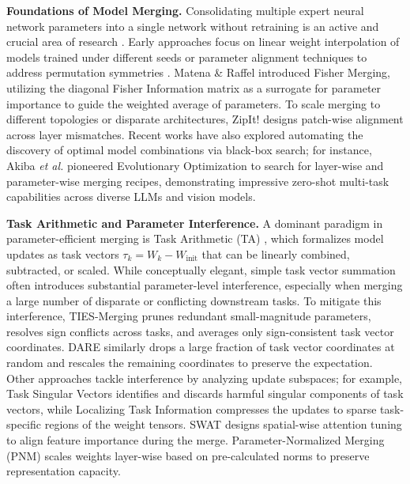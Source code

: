 \documentclass{article}
\newcommand{\etal}{\textit{et al.}}
\begin{document}
\textbf{Foundations of Model Merging.} Consolidating multiple expert neural network parameters into a single network without retraining is an active and crucial area of research \cite{survey2024model}. Early approaches focus on linear weight interpolation of models trained under different seeds \cite{wortsman2022model} or parameter alignment techniques to address permutation symmetries \cite{choshen2022fusing}. Matena \& Raffel \cite{matena2022fisher} introduced Fisher Merging, utilizing the diagonal Fisher Information matrix as a surrogate for parameter importance to guide the weighted average of parameters. To scale merging to different topologies or disparate architectures, ZipIt! \cite{stoica2023zipit} designs patch-wise alignment across layer mismatches. Recent works have also explored automating the discovery of optimal model combinations via black-box search; for instance, Akiba \etal \cite{akiba2024evolutionary} pioneered Evolutionary Optimization to search for layer-wise and parameter-wise merging recipes, demonstrating impressive zero-shot multi-task capabilities across diverse LLMs and vision models.

\textbf{Task Arithmetic and Parameter Interference.} A dominant paradigm in parameter-efficient merging is Task Arithmetic (TA) \cite{ilharco2022editing}, which formalizes model updates as task vectors $\tau_k = W_k - W_{\text{init}}$ that can be linearly combined, subtracted, or scaled. While conceptually elegant, simple task vector summation often introduces substantial parameter-level interference, especially when merging a large number of disparate or conflicting downstream tasks. To mitigate this interference, TIES-Merging \cite{yadav2023ties} prunes redundant small-magnitude parameters, resolves sign conflicts across tasks, and averages only sign-consistent task vector coordinates. DARE \cite{tokuda2024dae} similarly drops a large fraction of task vector coordinates at random and rescales the remaining coordinates to preserve the expectation. Other approaches tackle interference by analyzing update subspaces; for example, Task Singular Vectors \cite{tasksingular2024} identifies and discards harmful singular components of task vectors, while Localizing Task Information \cite{localizing2024} compresses the updates to sparse task-specific regions of the weight tensors. SWAT \cite{swat2023} designs spatial-wise attention tuning to align feature importance during the merge. Parameter-Normalized Merging (PNM) \cite{pnm2024} scales weights layer-wise based on pre-calculated norms to preserve representation capacity.
\end{document}
